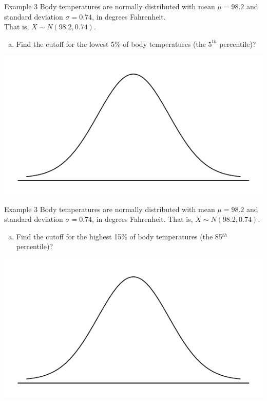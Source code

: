 \documentclass{beamer}
\begin{document}
\begin{frame}{Example 3}
\vspace{-1.75cm}
\small
Body temperatures are normally distributed with mean $\mu=98.2$ and standard deviation $\sigma= 0.74$, in degrees Fahrenheit.\\  That is, $X \sim N(98.2, 0.74)$.
\begin{enumerate}[(a)]
\item Find the cutoff for the lowest 5\% of body temperatures (the $5^{th}$ percentile)?
\end{enumerate}
\includegraphics[scale=0.5]{figure/norm_draw.pdf}
\end{frame}

\begin{frame}{Example 3}
\vspace{-1.75cm}
\small
Body temperatures are normally distributed with mean $\mu=98.2$ and standard deviation $\sigma= 0.74$, in degrees Fahrenheit.  That is, $X \sim N(98.2, 0.74)$.
\begin{enumerate}[(b)]
\item Find the cutoff for the highest 15\% of body temperatures (the 85$^{th}$ percentile)?
\end{enumerate}
\includegraphics[scale=0.5]{figure/norm_draw.pdf}
\end{frame}
\end{document}
